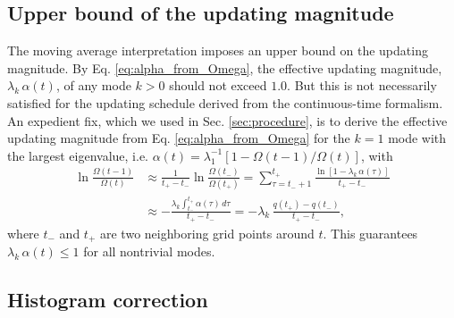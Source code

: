\documentclass[reprint, superscriptaddress, floatfix]{revtex4-1}
\begin{document}
\subsection{\label{sec:ave_ub}
Upper bound of the updating magnitude}

The moving average interpretation imposes
an upper bound on the updating magnitude.
%
By Eq. \eqref{eq:alpha_from_Omega},
the effective updating magnitude, $\lambda_k \, \alpha(t)$,
of any mode $k > 0$
should not exceed $1.0$.
But this is not necessarily satisfied
for the updating schedule
derived from the continuous-time formalism.
%
An expedient fix,
which we used in Sec. \ref{sec:procedure},
is to derive the effective updating magnitude
from Eq. \eqref{eq:alpha_from_Omega}
for the $k = 1$ mode with the largest eigenvalue,
i.e.
$\alpha(t) = \lambda_1^{-1}[1-\Omega(t-1)/\Omega(t)]$,
with
\begin{align*}
  \ln \frac{ \Omega(t-1) } { \Omega(t) }
  &\approx
  \frac{1}{t_+ - t_-} \ln \frac{ \Omega(t_-) } { \Omega(t_+) }
  =
  \!\!\sum_{\tau=t_- + 1}^{t_+}
  \frac{ \ln[1- \lambda_k \, \alpha(\tau)] } { t_+ - t_- }
  \\
  &\approx
  -\frac{ \lambda_k \int_{t_-}^{t_+} \alpha(\tau) \, d\tau}{t_+ - t_-}
  =
  -\lambda_k \, \frac{q(t_+) - q(t_-)}{t_+ - t_-}
  ,
\end{align*}
where $t_-$ and $t_+$ are two neighboring grid points
around $t$.
%
This guarantees $\lambda_k \, \alpha(t) \le 1$
for all nontrivial modes.



\subsection{Histogram correction}
\end{document}
